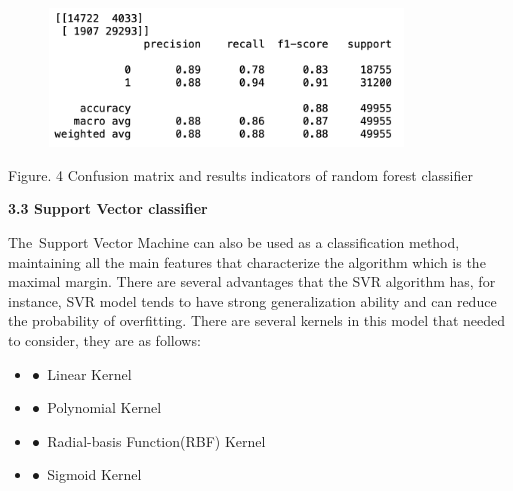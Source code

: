 \documentclass[12pt]{article}
\begin{document}
\begin{figure}[H]
	\begin{Center}
		\includegraphics[width=3.72in,height=1.45in]{./media/image7.png}
	\end{Center}
\end{figure}



\par

\begin{Center}
{\fontsize{8pt}{9.6pt}\selectfont Figure. 4 Confusion matrix and results indicators of random forest classifier\par}
\end{Center}\par


\vspace{\baselineskip}
\textbf{3.3 Support Vector classifier}\par

The\ Support Vector Machine can also be used as a classification  method, maintaining all the main features that characterize the algorithm which is the maximal margin. There are several advantages that the SVR algorithm has, for instance, SVR model tends to have strong generalization ability and can reduce the probability of overfitting. There are several kernels in this model that needed to consider, they are as follows:\par

\begin{itemize}
	\item ●\  Linear Kernel\par

	\item ●\  Polynomial Kernel\par

	\item ●\  Radial-basis Function(RBF) Kernel\par

\setlength{\parskip}{12.0pt}
	\item ●\  Sigmoid Kernel
\end{itemize}\par
\end{document}
